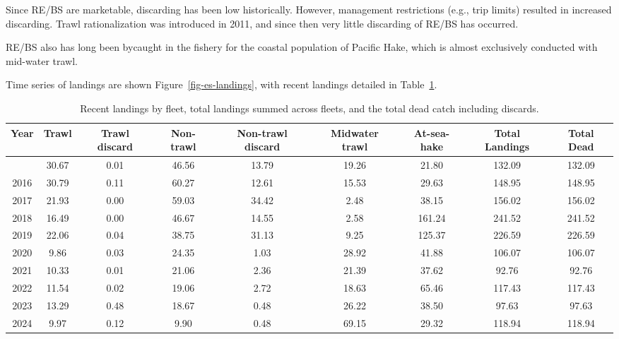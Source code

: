 \documentclass[
]{scrartcl}
\begin{document}
Since RE/BS are marketable, discarding has been low historically.
However, management restrictions (e.g., trip limits) resulted in
increased discarding. Trawl rationalization was introduced in 2011, and
since then very little discarding of RE/BS has occurred.

RE/BS also has long been bycaught in the fishery for the coastal
population of Pacific Hake, which is almost exclusively conducted with
mid-water trawl.

Time series of landings are shown Figure~\ref{fig-es-landings}, with
recent landings detailed in Table~\ref{tbl-es-catches}.

\begingroup
\fontsize{7.5pt}{9.0pt}\selectfont

\begin{longtable}{ccccccccc}

\caption{\label{tbl-es-catches}Recent landings by fleet, total landings
summed across fleets, and the total dead catch including discards.}

\tabularnewline

\toprule
Year & Trawl & Trawl 
 discard & Non-trawl & Non-trawl 
 discard & Midwater 
 trawl & At-sea-hake & Total Landings & Total Dead \\ 
\midrule\addlinespace[2.5pt]
2015 & 30.67 & 0.01 & 46.56 & 13.79 & 19.26 & 21.80 & 132.09 & 132.09 \\ 
2016 & 30.79 & 0.11 & 60.27 & 12.61 & 15.53 & 29.63 & 148.95 & 148.95 \\ 
2017 & 21.93 & 0.00 & 59.03 & 34.42 & 2.48 & 38.15 & 156.02 & 156.02 \\ 
2018 & 16.49 & 0.00 & 46.67 & 14.55 & 2.58 & 161.24 & 241.52 & 241.52 \\ 
2019 & 22.06 & 0.04 & 38.75 & 31.13 & 9.25 & 125.37 & 226.59 & 226.59 \\ 
2020 & 9.86 & 0.03 & 24.35 & 1.03 & 28.92 & 41.88 & 106.07 & 106.07 \\ 
2021 & 10.33 & 0.01 & 21.06 & 2.36 & 21.39 & 37.62 & 92.76 & 92.76 \\ 
2022 & 11.54 & 0.02 & 19.06 & 2.72 & 18.63 & 65.46 & 117.43 & 117.43 \\ 
2023 & 13.29 & 0.48 & 18.67 & 0.48 & 26.22 & 38.50 & 97.63 & 97.63 \\ 
2024 & 9.97 & 0.12 & 9.90 & 0.48 & 69.15 & 29.32 & 118.94 & 118.94 \\ 
\bottomrule

\end{longtable}

\endgroup
\end{document}
